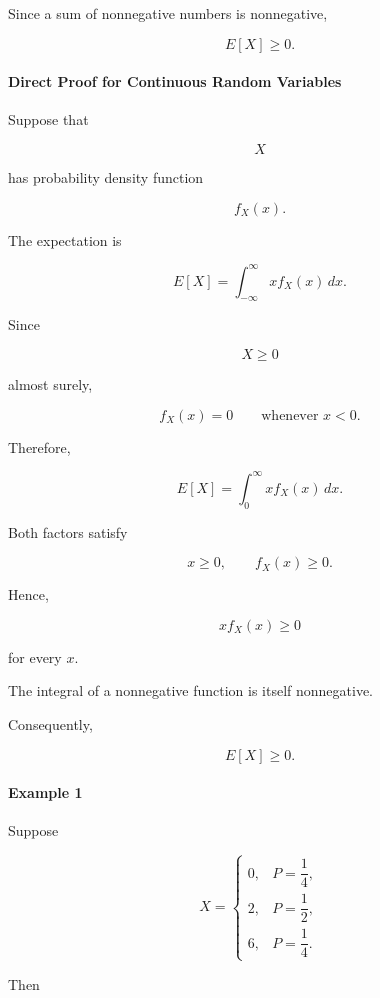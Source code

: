 \documentclass[11pt]{article}
\begin{document}
\begin{mdframed}[
		linewidth=0.8pt,
		roundcorner=6pt,
		backgroundcolor=gray!5,
		linecolor=gray!60,
		innertopmargin=10pt,
		innerbottommargin=10pt,
		innerleftmargin=10pt,
		innerrightmargin=10pt
		]
		Since a sum of nonnegative numbers is nonnegative,
		
		\[
		\boxed{
			E[X]\ge0.
		}
		\]
		
		\bigskip
		
		\paragraph{Direct Proof for Continuous Random Variables}
		
		Suppose that
		
		\[
		X
		\]
		
		has probability density function
		
		\[
		f_X(x).
		\]
		
		The expectation is
		
		\[
		E[X]
		=
		\int_{-\infty}^{\infty}
		x
		f_X(x)
		\,dx.
		\]
		
		Since
		
		\[
		X\ge0
		\]
		
		almost surely,
		
		\[
		f_X(x)=0
		\qquad
		\text{whenever }x<0.
		\]
		
		Therefore,
		
		\[
		E[X]
		=
		\int_0^{\infty}
		x
		f_X(x)
		\,dx.
		\]
		
		Both factors satisfy
		
		\[
		x\ge0,
		\qquad
		f_X(x)\ge0.
		\]
		
		Hence,
		
		\[
		x
		f_X(x)
		\ge0
		\]
		
		for every \(x\).
		
		The integral of a nonnegative function is itself nonnegative.
		
		Consequently,
		
		\[
		\boxed{
			E[X]\ge0.
		}
		\]
		
		\bigskip
		
		\paragraph{Example 1}
		
		Suppose
		
		\[
		X=
		\begin{cases}
			0,&P=\dfrac14,\\[0.2cm]
			2,&P=\dfrac12,\\[0.2cm]
			6,&P=\dfrac14.
		\end{cases}
		\]
		
		Then
		

\end{mdframed}
\end{document}
